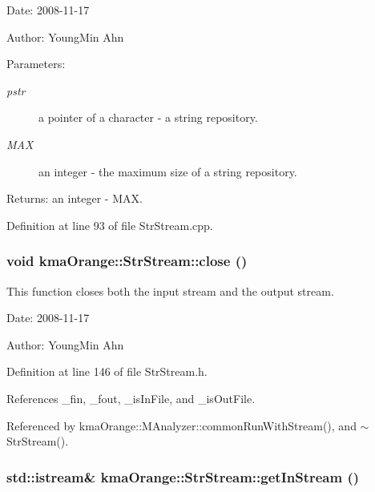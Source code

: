 \begin{Desc}
\item[Date:]2008-11-17 \end{Desc}
\begin{Desc}
\item[Author:]YoungMin Ahn \end{Desc}
\begin{Desc}
\item[Parameters:]
\begin{description}
\item[{\em pstr}]a pointer of a character - a string repository. \item[{\em MAX}]an integer - the maximum size of a string repository. \end{description}
\end{Desc}
\begin{Desc}
\item[Returns:]an integer - MAX. \end{Desc}


Definition at line 93 of file StrStream.cpp.\hypertarget{classkmaOrange_1_1StrStream_34015d2312ef738560106c753582506b}{
\subsubsection[{close}]{\setlength{\rightskip}{0pt plus 5cm}void kmaOrange::StrStream::close ()}}
\label{classkmaOrange_1_1StrStream_34015d2312ef738560106c753582506b}


This function closes both the input stream and the output stream. 

\begin{Desc}
\item[Date:]2008-11-17 \end{Desc}
\begin{Desc}
\item[Author:]YoungMin Ahn \end{Desc}


Definition at line 146 of file StrStream.h.

References \_\-fin, \_\-fout, \_\-isInFile, and \_\-isOutFile.

Referenced by kmaOrange::MAnalyzer::commonRunWithStream(), and $\sim$StrStream().\hypertarget{classkmaOrange_1_1StrStream_54f1c6671fa352d232aff029810bdcd9}{
\subsubsection[{getInStream}]{\setlength{\rightskip}{0pt plus 5cm}std::istream\& kmaOrange::StrStream::getInStream ()}}
\label{classkmaOrange_1_1StrStream_54f1c6671fa352d232aff029810bdcd9}


